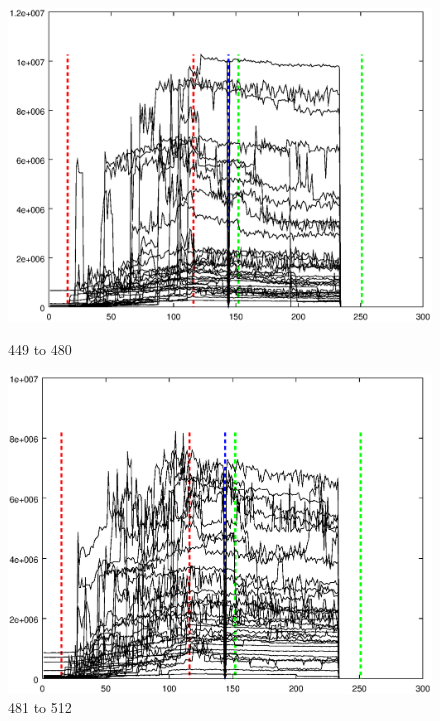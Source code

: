 \documentclass{article}
\begin{document}
\begin{figure}[h]
\centering
\begin{minipage}{.49\textwidth}
	\centering
	\includegraphics[width=0.79\linewidth]{measurement/spad_449-480}
	\caption{449 to 480}
	\label{fig:spad_449-480}
\end{minipage}
\begin{minipage}{.49\textwidth}
	\centering
	\includegraphics[width=0.79\linewidth]{measurement/spad_481-512}
	\caption{481 to 512}
	\label{fig:spad_481-512}
\end{minipage}
\end{figure}
\end{document}
